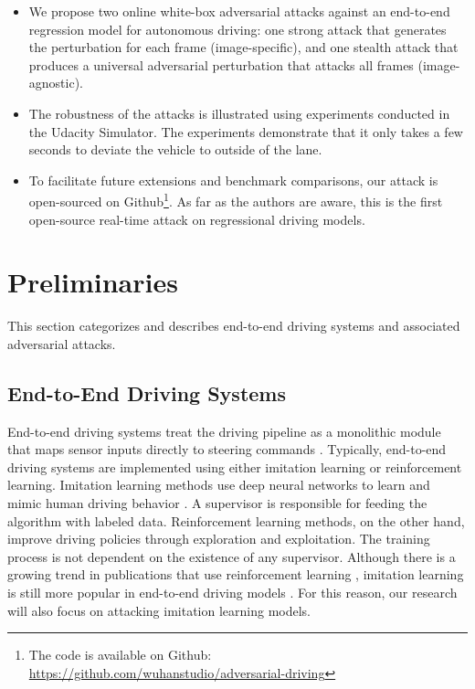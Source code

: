 \begin{itemize}
    \item We propose two online white-box adversarial attacks against an end-to-end regression model for autonomous driving: one strong attack that generates the perturbation for each frame (image-specific), and one stealth attack that produces a universal adversarial perturbation that attacks all frames (image-agnostic).
    \item The robustness of the attacks is illustrated using experiments conducted in the Udacity Simulator. 
    The experiments demonstrate that it only takes a few seconds to deviate the vehicle to outside of the lane.
    \item To facilitate future extensions and benchmark comparisons, our attack is open-sourced on Github\footnote{The code is available on Github: \url{https://github.com/wuhanstudio/adversarial-driving}}. As far as the authors are aware, this is the first open-source real-time attack on regressional driving models.
\end{itemize}


\section{Preliminaries}


This section categorizes and describes end-to-end driving systems and associated adversarial attacks.

\subsection{End-to-End Driving Systems}


End-to-end driving systems treat the driving pipeline as a monolithic module that maps sensor inputs directly to steering commands \citep{Yurtsever2020}. Typically, end-to-end driving systems are implemented using either imitation learning or reinforcement learning. Imitation learning methods use deep neural networks to learn and mimic human driving behavior \citep{chen2022learning}. A supervisor is responsible for feeding the algorithm with labeled data. Reinforcement learning methods, on the other hand, improve driving policies through exploration and exploitation. The training process is not dependent on the existence of any supervisor. Although there is a growing trend in publications that use reinforcement learning \citep{Chopra2020, perez2022deep, 1286725, jaafra2019seeking, Chitta2021ICCV}, imitation learning is still more popular in end-to-end driving models \citep{tampuu2020survey, Prakash2021CVPR, Chitta2022PAMI, wu2022trajectory}. For this reason, our research will also focus on attacking imitation learning models.


